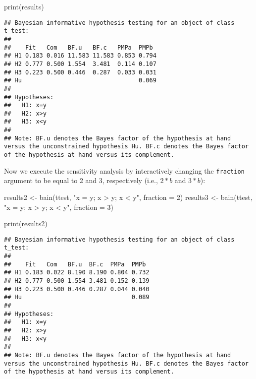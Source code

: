 \documentclass[
]{book}
\newenvironment{Shaded}{\begin{snugshade}}{\end{snugshade}}
\newcommand{\AttributeTok}[1]{\textcolor[rgb]{0.77,0.63,0.00}{#1}}
\newcommand{\DecValTok}[1]{\textcolor[rgb]{0.00,0.00,0.81}{#1}}
\newcommand{\FunctionTok}[1]{\textcolor[rgb]{0.00,0.00,0.00}{#1}}
\newcommand{\NormalTok}[1]{#1}
\newcommand{\OtherTok}[1]{\textcolor[rgb]{0.56,0.35,0.01}{#1}}
\newcommand{\StringTok}[1]{\textcolor[rgb]{0.31,0.60,0.02}{#1}}
\begin{document}
\begin{Shaded}
\begin{Highlighting}[]
\FunctionTok{print}\NormalTok{(results)}
\end{Highlighting}
\end{Shaded}

\begin{verbatim}
## Bayesian informative hypothesis testing for an object of class t_test:
## 
##    Fit   Com   BF.u   BF.c   PMPa  PMPb 
## H1 0.183 0.016 11.583 11.583 0.853 0.794
## H2 0.777 0.500 1.554  3.481  0.114 0.107
## H3 0.223 0.500 0.446  0.287  0.033 0.031
## Hu                                 0.069
## 
## Hypotheses:
##   H1: x=y
##   H2: x>y
##   H3: x<y
## 
## Note: BF.u denotes the Bayes factor of the hypothesis at hand versus the unconstrained hypothesis Hu. BF.c denotes the Bayes factor of the hypothesis at hand versus its complement.
\end{verbatim}

Now we execute the sensitivity analysis by interactively changing the \texttt{fraction} argument to be equal to 2 and 3, respectively (i.e., \(2*b\) and \(3*b\)):

\begin{Shaded}
\begin{Highlighting}[]
\NormalTok{results2 }\OtherTok{\textless{}{-}} \FunctionTok{bain}\NormalTok{(ttest, }\StringTok{"x = y; x \textgreater{} y; x \textless{} y"}\NormalTok{, }\AttributeTok{fraction =} \DecValTok{2}\NormalTok{)}
\NormalTok{results3 }\OtherTok{\textless{}{-}} \FunctionTok{bain}\NormalTok{(ttest, }\StringTok{"x = y; x \textgreater{} y; x \textless{} y"}\NormalTok{, }\AttributeTok{fraction =} \DecValTok{3}\NormalTok{)}
\end{Highlighting}
\end{Shaded}

\begin{Shaded}
\begin{Highlighting}[]
\FunctionTok{print}\NormalTok{(results2)}
\end{Highlighting}
\end{Shaded}

\begin{verbatim}
## Bayesian informative hypothesis testing for an object of class t_test:
## 
##    Fit   Com   BF.u  BF.c  PMPa  PMPb 
## H1 0.183 0.022 8.190 8.190 0.804 0.732
## H2 0.777 0.500 1.554 3.481 0.152 0.139
## H3 0.223 0.500 0.446 0.287 0.044 0.040
## Hu                               0.089
## 
## Hypotheses:
##   H1: x=y
##   H2: x>y
##   H3: x<y
## 
## Note: BF.u denotes the Bayes factor of the hypothesis at hand versus the unconstrained hypothesis Hu. BF.c denotes the Bayes factor of the hypothesis at hand versus its complement.
\end{verbatim}
\end{document}
